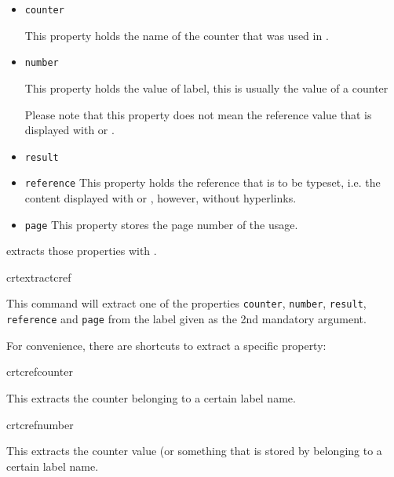 \documentclass[12pt,a4paper,oneside]{article}
\makeatletter
\newcommand{\chdocextractversion}[1]{%
  \@nameuse{#1}%
}
\newcommand{\CHDocExpCommand}[1][Expandable]{%
  \tcbdocmarginnote[doclang/new={N},
  colframe=green!50!blue,
  halign=left,
  colback={green!90!blue},
  fontupper={\tiny}
  ]{%
    #1%
  }%
}
\newcommand{\PackageDocName}{crossreftools}%
\makeatother
\begin{document}
\begin{itemize}
  \item \texttt{counter}

    This property holds the name of the counter that was used in .


  \item \texttt{number}

    This property holds the value of label, this is usually the value of a counter
    \begin{marker}
      Please note that this property does not mean the reference value that is displayed with  or . 
    \end{marker}
  \item \texttt{result}
    
  \item \texttt{reference}
    This property holds the reference that is to be typeset, i.e. the content displayed with  or , however, without hyperlinks. 

  \item \texttt{page}
    This property stores the page number of the  usage.
    
\end{itemize}
\CHDocPackage{\PackageDocName} extracts those properties with . 

\begin{docCommand}[code={\CHDocExpCommand{}},
doc new={\chdocextractversion{crossreftoolsversion0.1}}]{crtextractcref}{}

This command will extract one of the properties \texttt{counter}, \texttt{number}, \texttt{result}, \texttt{reference} and \texttt{page} from the label given as the 2nd mandatory argument. 
\end{docCommand}

For convenience, there are shortcuts to extract a specific property:

\begin{docCommand}[code={\CHDocExpCommand{}},
doc new={\chdocextractversion{crossreftoolsversion0.1}}]{crtcrefcounter}{}

This extracts the counter belonging to a certain label name.
\end{docCommand}


\begin{docCommand}[code={\CHDocExpCommand{}},
doc new={\chdocextractversion{crossreftoolsversion0.1}}]{crtcrefnumber}{}

This extracts the counter value (or something that is stored by  belonging to a certain label name.
\end{docCommand}
\end{document}
